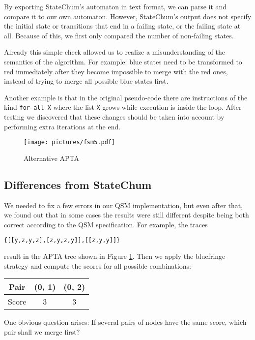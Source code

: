 \documentclass[]{sigplanconf}
\begin{document}
By exporting StateChum's automaton in text format, we can parse it and
compare it to our own automaton. However, StateChum's output does not specify
the initial state or transitions that end in a failing state, or the failing
state at all. Because of this, we first only compared the number of 
non-failing states.

Already this simple check allowed us to realize a misunderstanding
of the semantics of the algorithm. For example: blue states need to
be transformed to red immediately after they become impossible to merge
with the red ones, instead of trying to merge all possible blue states
first.

Another example is that in the original pseudo-code there are
instructions of the kind \texttt{for all X} where the list \texttt{X}
grows while execution is inside the loop. After testing we
discovered that these changes should be taken into account by
performing extra iterations at the end.

\begin{figure}
\begin{center}
\texttt{[image: pictures/fsm5.pdf]}
\end{center}
\caption{Alternative APTA}
\label{fsm5}
\end{figure}

\subsection{Differences from StateChum}

We needed to fix a few errors in our QSM implementation, but even after that,
we found out that in some cases the results were still different despite
being both correct according to the QSM specification.
For example, the traces 
\begin{verbatim}
{[[y,z,y,z],[z,y,z,y]],[[z,y,y]]}
\end{verbatim}
result in the APTA tree shown in Figure \ref{fsm5}.
Then we apply the bluefringe strategy and compute the scores for all possible
combinations:

\begin{center}
\begin{tabular}{c||c|c}
Pair & (0, 1) & (0, 2)\\\hline\hline
Score & 3 & 3
\end{tabular}
\end{center}
One obvious question arises: If several pairs of nodes have the same score,
which pair shall we merge first?
\end{document}
